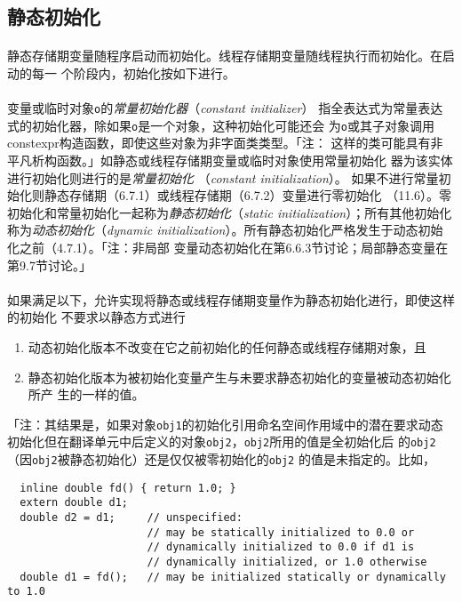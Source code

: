 \subsection{静态初始化}
\paragraph{}
静态存储期变量随程序启动而初始化。线程存储期变量随线程执行而初始化。在启动的每一
个阶段内，初始化按如下进行。

\paragraph{}
变量或临时对象\texttt{o}的\textit{常量初始化器}（\textit{constant initializer}）
指全表达式为常量表达式的初始化器，除如果\texttt{o}是一个对象，这种初始化可能还会
为\texttt{o}或其子对象调用constexpr构造函数，即使这些对象为非字面类类型。「注：
这样的类可能具有非平凡析构函数。」如静态或线程存储期变量或临时对象使用常量初始化
器为该实体进行初始化则进行的是\textit{常量初始化}
（\textit{constant initialization}）。
如果不进行常量初始化则静态存储期（6.7.1）或线程存储期（6.7.2）变量进行零初始化
（11.6）。零初始化和常量初始化一起称为\textit{静态初始化}（\textit{static
initialization}）；所有其他初始化称为\textit{动态初始化}（\textit{dynamic
initialization}）。所有静态初始化严格发生于动态初始化之前（4.7.1）。「注：非局部
变量动态初始化在第6.6.3节讨论；局部静态变量在第9.7节讨论。」

\paragraph{}
如果满足以下，允许实现将静态或线程存储期变量作为静态初始化进行，即使这样的初始化
不要求以静态方式进行
\begin{enumerate}
  \item{动态初始化版本不改变在它之前初始化的任何静态或线程存储期对象，且}
  \item{静态初始化版本为被初始化变量产生与未要求静态初始化的变量被动态初始化所产
    生的一样的值。}
\end{enumerate}
「注：其结果是，如果对象\texttt{obj1}的初始化引用命名空间作用域中的潜在要求动态
初始化但在翻译单元中后定义的对象\texttt{obj2}，\texttt{obj2}所用的值是全初始化后
的\texttt{obj2}（因\texttt{obj2}被静态初始化）还是仅仅被零初始化的\texttt{obj2}
的值是未指定的。比如，
\begin{lstlisting}
  inline double fd() { return 1.0; }
  extern double d1;
  double d2 = d1;     // unspecified:
                      // may be statically initialized to 0.0 or
                      // dynamically initialized to 0.0 if d1 is
                      // dynamically initialized, or 1.0 otherwise
  double d1 = fd();   // may be initialized statically or dynamically to 1.0
\end{lstlisting}

